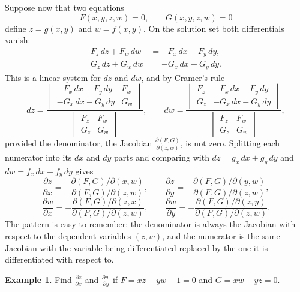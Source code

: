 \documentclass[11pt,a4paper]{article}
\theoremstyle{definition}
\newtheorem{exa}[thm]{Example}
\begin{document}
Suppose now that two equations
\[F(x,y,z,w) = 0,\qquad G(x,y,z,w) = 0\]
define $z = g(x,y)$ and $w = f(x,y)$. On the solution set both differentials
vanish:
\begin{align*}
F_z\,dz + F_w\,dw & = -F_x\,dx - F_y\,dy,\\
G_z\,dz + G_w\,dw & = -G_x\,dx - G_y\,dy .
\end{align*}
This is a linear system for $dz$ and $dw$, and by Cramer's rule
\[dz = \frac{
\begin{vmatrix}
-F_x\,dx -F_y\,dy & F_w\\
-G_x\,dx -G_y\,dy & G_w
\end{vmatrix}
}{
\begin{vmatrix}
F_z & F_w\\
G_z & G_w
\end{vmatrix}
},\qquad dw =
\frac{
\begin{vmatrix}
F_z & -F_x\,dx - F_y\,dy\\
G_z & -G_x\,dx - G_y\,dy
\end{vmatrix}
}{
\begin{vmatrix}
F_z & F_w\\
G_z & G_w
\end{vmatrix}
},\]
provided the denominator, the Jacobian $\frac{\partial(F,G)}{\partial(z,w)}$, is
not zero. Splitting each numerator into its $dx$ and $dy$ parts and comparing
with $dz = g_x\,dx + g_y\,dy$ and $dw = f_x\,dx + f_y\,dy$ gives
\[\frac{\partial z}{\partial x} = -\frac{\partial (F,G)/\partial
(x,w)}{\partial (F,G)/\partial (z,w)},\qquad \frac{\partial z}{\partial y}=
-\frac{\partial (F,G)/\partial (y,w)}{\partial (F,G)/\partial (z,w)},\]
\[\frac{\partial w}{\partial x} = -\frac{\partial (F,G)/\partial
(z,x)}{\partial (F,G)/\partial (z,w)},\qquad \frac{\partial w}{\partial y}=
-\frac{\partial (F,G)/\partial (z,y)}{\partial (F,G)/\partial (z,w)} .\]
The pattern is easy to remember: the denominator is always the Jacobian with
respect to the dependent variables $(z,w)$, and the numerator is the same
Jacobian with the variable being differentiated replaced by the one it is
differentiated with respect to.

\begin{exa}
\label{ex:twoeqgeneral}
Find $\frac{\partial z}{\partial x}$ and $\frac{\partial w}{\partial y}$ if
$F = xz + yw - 1 = 0$ and $G = xw - yz = 0$.
\end{exa}
\end{document}
